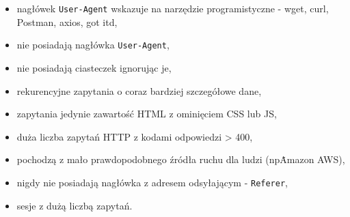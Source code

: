 \begin{itemize}
    \item nagłówek \texttt{User-Agent} wskazuje na narzędzie programistyczne - wget, curl, Postman, axios, got itd,
    \item nie posiadają nagłówka \texttt{User-Agent},
    \item nie posiadają ciasteczek ignorując je,
    \item rekurencyjne zapytania o coraz bardziej szczegółowe dane,
    \item zapytania jedynie zawartość HTML z ominięciem CSS lub JS,
    \item duża liczba zapytań HTTP z kodami odpowiedzi > 400,
    \item pochodzą z mało prawdopodobnego źródła ruchu dla ludzi (np\. Amazon AWS),
    \item nigdy nie posiadają nagłówka z adresem odsyłającym - \texttt{Referer},
    \item sesje z dużą liczbą zapytań\cite{bot-buster}.
\end{itemize}
